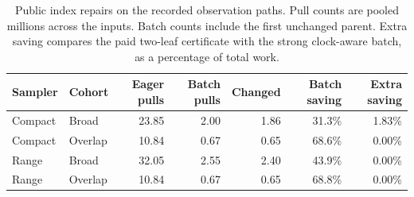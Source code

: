 \begin{table}[t]\centering\small
\caption{Public index repairs on the recorded observation paths. Pull counts are pooled millions across the inputs. Batch counts include the first unchanged parent. Extra saving compares the paid two-leaf certificate with the strong clock-aware batch, as a percentage of total work.}
\label{tab:ancestor-replay}
\begin{tabular}{@{}llrrrrr@{}}\toprule
Sampler & Cohort & Eager pulls & Batch pulls & Changed & Batch saving & Extra saving\\\midrule
Compact & Broad & 23.85 & 2.00 & 1.86 & 31.3\% & 1.83\%\\
Compact & Overlap & 10.84 & 0.67 & 0.65 & 68.6\% & 0.00\%\\
Range & Broad & 32.05 & 2.55 & 2.40 & 43.9\% & 0.00\%\\
Range & Overlap & 10.84 & 0.67 & 0.65 & 68.8\% & 0.00\%\\
\bottomrule\end{tabular}\end{table}
